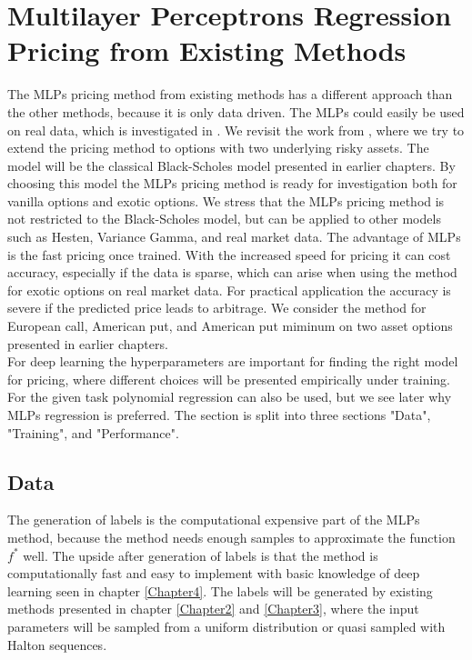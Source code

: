 \section{Multilayer Perceptrons Regression Pricing from Existing Methods}
The MLPs pricing method from existing methods has a different approach than the other methods, because it is only data driven. The MLPs could easily be used on real data, which is investigated in \parencite{GasparRaquel20}. We revisit the work from \parencite{HirsaAli2019}, where we try to extend the pricing method to options with two underlying risky assets. The model will be the classical Black-Scholes model presented in earlier chapters. By choosing this model the MLPs pricing method is ready for investigation both for vanilla options and exotic options. We stress that the MLPs pricing method is not restricted to the Black-Scholes model, but can be applied to other models such as Hesten, Variance Gamma, and real market data. The advantage of MLPs is the fast pricing once trained. With the increased speed for pricing it can cost accuracy, especially if the data is sparse, which can arise when using the method for exotic options on real market data. For practical application the accuracy is severe if the predicted price leads to arbitrage. We consider the method for European call, American put, and American put miminum on two asset options presented in earlier chapters.\\

For deep learning the hyperparameters are important for finding the right model for pricing, where different choices will be presented empirically under training. For the given task polynomial regression can also be used, but we see later why MLPs regression is preferred. The section is split into three sections "Data", "Training", and "Performance".

\subsection{Data}
The generation of labels is the computational expensive part of the MLPs method, because the method needs enough samples to approximate the function $f^*$ well. The upside after generation of labels is that the method is computationally fast and easy to implement with basic knowledge of deep learning seen in chapter \ref{Chapter4}. The labels will be generated by existing methods presented in chapter \ref{Chapter2} and \ref{Chapter3}, where the input parameters will be sampled from a uniform distribution or quasi sampled with Halton sequences.\\

